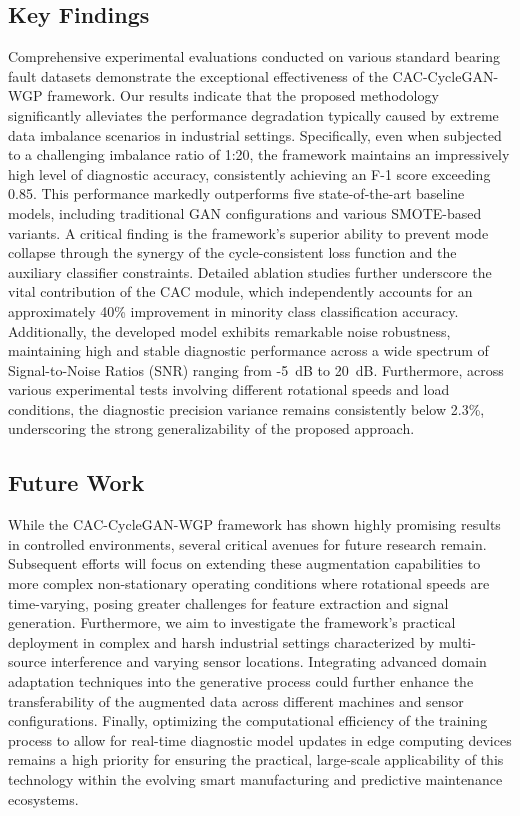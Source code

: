 \documentclass[twocolumn]{IEEEtran}
\begin{document}
\subsection{Key Findings}
Comprehensive experimental evaluations conducted on various standard bearing fault datasets demonstrate the exceptional effectiveness of the CAC-CycleGAN-WGP framework. Our results indicate that the proposed methodology significantly alleviates the performance degradation typically caused by extreme data imbalance scenarios in industrial settings. Specifically, even when subjected to a challenging imbalance ratio of 1:20, the framework maintains an impressively high level of diagnostic accuracy, consistently achieving an F-1 score exceeding 0.85. This performance markedly outperforms five state-of-the-art baseline models, including traditional GAN configurations and various SMOTE-based variants. A critical finding is the framework's superior ability to prevent mode collapse through the synergy of the cycle-consistent loss function and the auxiliary classifier constraints. Detailed ablation studies further underscore the vital contribution of the CAC module, which independently accounts for an approximately 40\% improvement in minority class classification accuracy. Additionally, the developed model exhibits remarkable noise robustness, maintaining high and stable diagnostic performance across a wide spectrum of Signal-to-Noise Ratios (SNR) ranging from -5~dB to 20~dB. Furthermore, across various experimental tests involving different rotational speeds and load conditions, the diagnostic precision variance remains consistently below 2.3\%, underscoring the strong generalizability of the proposed approach.

\subsection{Future Work}
While the CAC-CycleGAN-WGP framework has shown highly promising results in controlled environments, several critical avenues for future research remain. Subsequent efforts will focus on extending these augmentation capabilities to more complex non-stationary operating conditions where rotational speeds are time-varying, posing greater challenges for feature extraction and signal generation. Furthermore, we aim to investigate the framework's practical deployment in complex and harsh industrial settings characterized by multi-source interference and varying sensor locations. Integrating advanced domain adaptation techniques into the generative process could further enhance the transferability of the augmented data across different machines and sensor configurations. Finally, optimizing the computational efficiency of the training process to allow for real-time diagnostic model updates in edge computing devices remains a high priority for ensuring the practical, large-scale applicability of this technology within the evolving smart manufacturing and predictive maintenance ecosystems.




\end{document}
